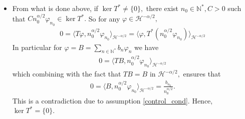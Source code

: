 \documentclass[11pt, dvipsnames]{amsart}
\begin{document}
\begin{itemize}
    $\text{Eig}((1-\bar \rho \mu)/\mu)=\text{span}
    \{n_0^{\alpha/2}\varphi_{n_0}\}.$ In view of \eqref{Eig}, $h\in \text{Eig}((1-\bar \rho \mu)/\mu)$, then there exists $C>0$ such that
    $h=Cn_0^{\alpha/2}\varphi_{n_0}.$ So, we have finally shown that if $\ker T^*\neq \{0\},$ there exist $n_0\in \mathbb{N}^*, C>0$ such that $Cn_0^{\alpha/2} \varphi_{n_0}\in \ker T^*$ and $Cn_0^{\alpha/2} \varphi_{n_0}$ is an eigenfunction of $(\mathcal{A}^*+\bar\rho I).$
    \item From what is done above, if $\ker T^*\neq \{0\},$ there exist $n_0\in \mathbb{N}^*, C>0$ such that $Cn_0^{\alpha/2} \varphi_{n_0}\in \ker T^*.$ So for any $\varphi\in \mathcal{H}^{-\alpha/2},$
    \begin{align*}
        0=\langle T\varphi,n_0^{\alpha/2} \varphi_{n_0}\rangle_{\mathcal{H}^{-\alpha/2}}=\langle \varphi,T^*(n_0^{\alpha/2} \varphi_{n_0})\rangle_{\mathcal{H}^{-\alpha/2}}
    \end{align*}
    In particular for $\varphi=B=\displaystyle\sum_{n\in \mathbb{N}^*}b_n \varphi_n$ we have
    \begin{align*}
        0=\langle TB,n_0^{\alpha/2} \varphi_{n_0}\rangle_{\mathcal{H}^{-\alpha/2}}
    \end{align*} which combining with the fact that $TB=B$ in $\mathcal{H}^{-\alpha/2},$ ensures that
    \begin{align*}
        0=\langle B ,n_0^{\alpha/2} \varphi_{n_0}\rangle_{\mathcal{H}^{-\alpha/2}}=\frac{b_{n_0}}{n_0^{\alpha/2}}.
    \end{align*}
    This is a contradiction due to assumption \eqref{control_cond}. Hence, $\ker T^*=\{0\}.$
\end{itemize}
\end{document}
